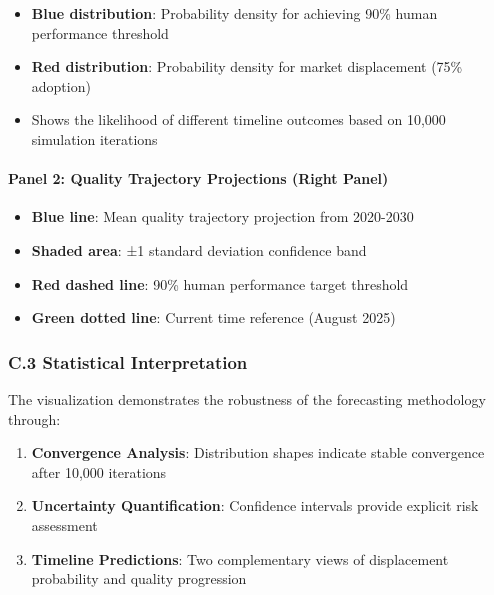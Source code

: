 \documentclass[12pt,a4paper]{article}
\begin{document}
{{{{{\begin{itemize}
\item \textbf{Blue distribution}: Probability density for achieving 90\% human performance threshold
\item \textbf{Red distribution}: Probability density for market displacement (75\% adoption)
\item Shows the likelihood of different timeline outcomes based on 10,000 simulation iterations
\end{itemize}

\hypertarget{panel-2-quality-trajectory-projections}{%
\paragraph{Panel 2: Quality Trajectory Projections (Right Panel)}\label{panel-2-quality-trajectory-projections}}

\begin{itemize}
\item \textbf{Blue line}: Mean quality trajectory projection from 2020-2030
\item \textbf{Shaded area}: ±1 standard deviation confidence band
\item \textbf{Red dashed line}: 90\% human performance target threshold
\item \textbf{Green dotted line}: Current time reference (August 2025)
\end{itemize}

\hypertarget{statistical-interpretation}{%
\subsubsection{C.3 Statistical Interpretation}\label{statistical-interpretation}}

The visualization demonstrates the robustness of the forecasting methodology through:

\begin{enumerate}
\item \textbf{Convergence Analysis}: Distribution shapes indicate stable convergence after 10,000 iterations
\item \textbf{Uncertainty Quantification}: Confidence intervals provide explicit risk assessment
\item \textbf{Timeline Predictions}: Two complementary views of displacement probability and quality progression
\end{enumerate}

\hypertarget{technical-implementation-c4}{%
}}}}}}
\end{document}
